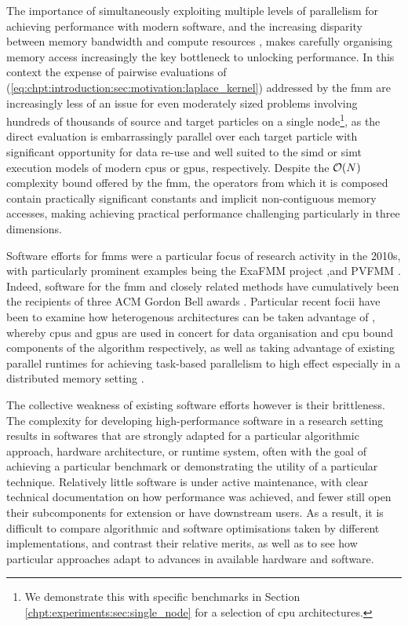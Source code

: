 The importance of simultaneously exploiting multiple levels of parallelism for achieving performance with modern software, and the increasing disparity between memory bandwidth and compute resources \cite{dongarra2017extreme}, makes carefully organising memory access increasingly the key bottleneck to unlocking performance. In this context the expense of pairwise evaluations of (\ref{eq:chpt:introduction:sec:motivation:laplace_kernel}) addressed by the \acrshort{fmm} are increasingly less of an issue for even moderately sized problems involving hundreds of thousands of source and target particles on a single node\footnote{We demonstrate this with specific benchmarks in Section \ref{chpt:experiments:sec:single_node} for a selection of \acrshort{cpu} architectures.}, as the direct evaluation is embarrassingly parallel over each target particle with significant opportunity for data re-use and well suited to the \acrshort{simd} or \acrshort{simt} execution models of modern \glspl{cpu} or \glspl{gpu}, respectively. Despite the $\mathcal{O}(N)$ complexity bound offered by the \acrshort{fmm}, the operators from which it is composed contain practically significant constants and implicit non-contiguous memory accesses, making achieving practical performance challenging particularly in three dimensions.

Software efforts for \glspl{fmm} were a particular focus of research activity in the 2010s, with particularly prominent examples being the ExaFMM project \cite{barba2011exafmm, wang2021exafmm},and PVFMM \cite{malhotra2015pvfmm}. Indeed, software for the \acrshort{fmm} and closely related methods have cumulatively been the recipients of three ACM Gordon Bell awards \cite{bell2017look}. Particular recent focii have been to examine how heterogenous architectures can be taken advantage of \cite{malhotra2015pvfmm}, whereby \glspl{cpu} and \glspl{gpu} are used in concert for data organisation and \acrshort{cpu} bound components of the algorithm respectively, as well as taking advantage of existing parallel runtimes for achieving task-based parallelism to high effect especially in a distributed memory setting \cite{bramas2020tbfmm, agullo2014task}.

The collective weakness of existing software efforts however is their brittleness. The complexity for developing high-performance software in a research setting results in softwares that are strongly adapted for a particular algorithmic approach, hardware architecture, or runtime system, often with the goal of achieving a particular benchmark or demonstrating the utility of a particular technique. Relatively little software is under active maintenance, with clear technical documentation on how performance was achieved, and fewer still open their subcomponents for extension or have downstream users. As a result, it is difficult to compare algorithmic and software optimisations taken by different implementations, and contrast their relative merits, as well as to see how particular approaches adapt to advances in available hardware and software.

